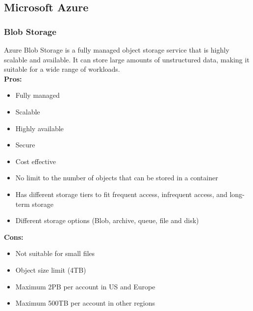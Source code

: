     \subsection{Microsoft Azure}
    
        \subsubsection{Blob Storage}
        \label{azure:blob-storage}
        Azure Blob Storage is a fully managed object storage service that is highly scalable and available. 
        It can store large amounts of unstructured data, making it suitable for a wide range of workloads.\\
        \textbf{Pros:}
        \begin{itemize}
            \item Fully managed
            \item Scalable
            \item Highly available
            \item Secure
            \item Cost effective
            \item No limit to the number of objects that can be stored in a container
            \item Has different storage tiers to fit frequent access, infrequent access, and long-term storage
            \item Different storage options (Blob, archive, queue, file and disk) 
        \end{itemize}
        \textbf{Cons:}
        \begin{itemize}
            \item Not suitable for small files
            \item Object size limit (4TB)
            \item Maximum 2PB per account in US and Europe
            \item Maximum 500TB per account in other regions
        \end{itemize}

